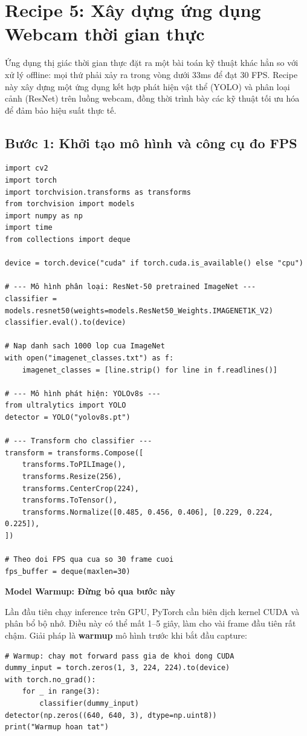 \section{Recipe 5: Xây dựng ứng dụng Webcam thời gian thực}
\label{sec:recipe_realtime}

Ứng dụng thị giác thời gian thực đặt ra một bài toán kỹ thuật khác hẳn so với xử lý offline: mọi thứ phải xảy ra trong vòng dưới 33ms để đạt 30 FPS. Recipe này xây dựng một ứng dụng kết hợp phát hiện vật thể (YOLO) và phân loại cảnh (ResNet) trên luồng webcam, đồng thời trình bày các kỹ thuật tối ưu hóa để đảm bảo hiệu suất thực tế.

\subsection{Bước 1: Khởi tạo mô hình và công cụ đo FPS}
\label{subsec:rt_init}

\begin{verbatim}
import cv2
import torch
import torchvision.transforms as transforms
from torchvision import models
import numpy as np
import time
from collections import deque

device = torch.device("cuda" if torch.cuda.is_available() else "cpu")

# --- Mô hình phân loại: ResNet-50 pretrained ImageNet ---
classifier = models.resnet50(weights=models.ResNet50_Weights.IMAGENET1K_V2)
classifier.eval().to(device)

# Nap danh sach 1000 lop cua ImageNet
with open("imagenet_classes.txt") as f:
    imagenet_classes = [line.strip() for line in f.readlines()]

# --- Mô hình phát hiện: YOLOv8s ---
from ultralytics import YOLO
detector = YOLO("yolov8s.pt")

# --- Transform cho classifier ---
transform = transforms.Compose([
    transforms.ToPILImage(),
    transforms.Resize(256),
    transforms.CenterCrop(224),
    transforms.ToTensor(),
    transforms.Normalize([0.485, 0.456, 0.406], [0.229, 0.224, 0.225]),
])

# Theo doi FPS qua cua so 30 frame cuoi
fps_buffer = deque(maxlen=30)
\end{verbatim}

\begin{mdframed}[style=infobox]
\textbf{Model Warmup: Đừng bỏ qua bước này}

Lần đầu tiên chạy inference trên GPU, PyTorch cần biên dịch kernel CUDA và phân bổ bộ nhớ. Điều này có thể mất 1--5 giây, làm cho vài frame đầu tiên rất chậm. Giải pháp là \textbf{warmup} mô hình trước khi bắt đầu capture:

\begin{verbatim}
# Warmup: chay mot forward pass gia de khoi dong CUDA
dummy_input = torch.zeros(1, 3, 224, 224).to(device)
with torch.no_grad():
    for _ in range(3):
        classifier(dummy_input)
detector(np.zeros((640, 640, 3), dtype=np.uint8))
print("Warmup hoan tat")
\end{verbatim}
\end{mdframed}

